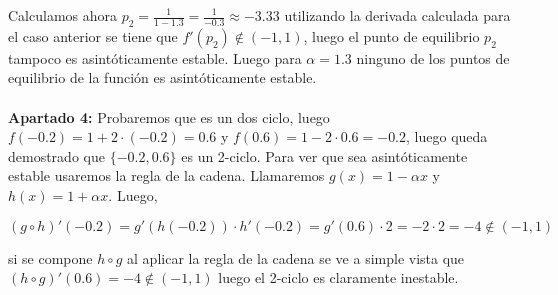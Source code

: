 \documentclass{article}
\begin{document}
Calculamos ahora $p_2 = \frac{1}{1-1.3}= \frac{1}{-0.3} \approx -3.33$ utilizando la derivada calculada para el caso anterior se tiene que $f'(p_2) \notin (-1,1)$, luego el punto de equilibrio $p_2$ tampoco es asintóticamente estable. Luego para $\alpha = 1.3$ ninguno de los puntos de equilibrio de la función es asintóticamente estable. \\ \\

\textbf{Apartado 4:} Probaremos que es un dos ciclo, luego $f(-0.2) = 1 + 2\cdot(-0.2) = 0.6$ y $f(0.6)= 1 - 2\cdot0.6 = -0.2$, luego queda demostrado que $\{-0.2,0.6\}$ es un 2-ciclo. Para ver que sea asintóticamente estable usaremos la regla de la cadena. Llamaremos $g(x) = 1 - \alpha x$ y $h(x) = 1 + \alpha x$. Luego,

\begin{equation*}
(g \circ h)'(-0.2) = g'(h(-0.2))\cdot h'(-0.2) = g'(0.6) \cdot 2 = -2 \cdot 2 = -4 \notin (-1,1)
\end{equation*}

si se compone $h \circ g$ al aplicar la regla de la cadena se ve a simple vista que $(h \circ g)'(0.6) = -4 \notin (-1,1)$ luego el 2-ciclo es claramente inestable. \\ \\
\end{document}

